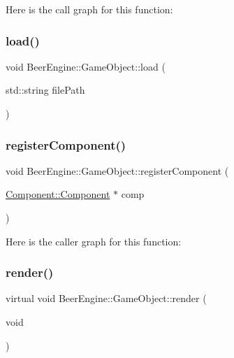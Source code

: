 Here is the call graph for this function\+:
\mbox{\label{class_beer_engine_1_1_game_object_a826c9b7b4077db777e3cf563c1d0328e}} 
\subsubsection{\texorpdfstring{load()}{load()}}
{\footnotesize\ttfamily void Beer\+Engine\+::\+Game\+Object\+::load (\begin{DoxyParamCaption}\item[{std\+::string}]{file\+Path }\end{DoxyParamCaption})}

\mbox{\label{class_beer_engine_1_1_game_object_a1454d7ec7fc8d98d621ae9be166976e4}} 
\subsubsection{\texorpdfstring{register\+Component()}{registerComponent()}}
{\footnotesize\ttfamily void Beer\+Engine\+::\+Game\+Object\+::register\+Component (\begin{DoxyParamCaption}\item[{\mbox{\hyperlink{class_beer_engine_1_1_component_1_1_component}{Component\+::\+Component}} $\ast$}]{comp }\end{DoxyParamCaption})\hspace{0.3cm}{\ttfamily [inline]}}

Here is the caller graph for this function\+:
\mbox{\label{class_beer_engine_1_1_game_object_ac74ff77a1e62e76eff1247c4d3daaa33}} 
\subsubsection{\texorpdfstring{render()}{render()}}
{\footnotesize\ttfamily virtual void Beer\+Engine\+::\+Game\+Object\+::render (\begin{DoxyParamCaption}\item[{void}]{ }\end{DoxyParamCaption})\hspace{0.3cm}{\ttfamily [virtual]}}

